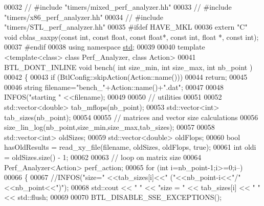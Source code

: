 \begin{DoxyCode}
00032 \textcolor{comment}{// #include "timers/mixed\_perf\_analyzer.hh"}
00033 \textcolor{comment}{// #include "timers/x86\_perf\_analyzer.hh"}
00034 \textcolor{comment}{// #include "timers/STL\_perf\_analyzer.hh"}
00035 \textcolor{preprocessor}{#ifdef HAVE\_MKL}
00036 \textcolor{keyword}{extern} \textcolor{stringliteral}{"C"} \textcolor{keywordtype}{void} cblas\_saxpy(\textcolor{keyword}{const} \textcolor{keywordtype}{int}, \textcolor{keyword}{const} \textcolor{keywordtype}{float}, \textcolor{keyword}{const} \textcolor{keywordtype}{float}*, \textcolor{keyword}{const} \textcolor{keywordtype}{int}, \textcolor{keywordtype}{float} *, \textcolor{keyword}{const} \textcolor{keywordtype}{int});
00037 \textcolor{preprocessor}{#endif}
00038 \textcolor{keyword}{using namespace }\hyperlink{namespacestd}{std};
00039 
00040 \textcolor{keyword}{template} <\textcolor{keyword}{template}<\textcolor{keyword}{class}> \textcolor{keyword}{class }Perf\_Analyzer, \textcolor{keyword}{class }Action>
00041 BTL\_DONT\_INLINE \textcolor{keywordtype}{void} bench( \textcolor{keywordtype}{int} size\_min, \textcolor{keywordtype}{int} size\_max, \textcolor{keywordtype}{int} nb\_point )
00042 \{
00043   \textcolor{keywordflow}{if} (BtlConfig::skipAction(Action::name()))
00044     \textcolor{keywordflow}{return};
00045 
00046   \textcolor{keywordtype}{string} filename=\textcolor{stringliteral}{"bench\_"}+Action::name()+\textcolor{stringliteral}{".dat"};
00047 
00048   INFOS(\textcolor{stringliteral}{"starting "} <<filename);
00049 
00050   \textcolor{comment}{// utilities}
00051 
00052   std::vector<double> tab\_mflops(nb\_point);
00053   std::vector<int> tab\_sizes(nb\_point);
00054 
00055   \textcolor{comment}{// matrices and vector size calculations}
00056   size\_lin\_log(nb\_point,size\_min,size\_max,tab\_sizes);
00057 
00058   std::vector<int> oldSizes;
00059   std::vector<double> oldFlops;
00060   \textcolor{keywordtype}{bool} hasOldResults = read\_xy\_file(filename, oldSizes, oldFlops, \textcolor{keyword}{true});
00061   \textcolor{keywordtype}{int} oldi = oldSizes.size() - 1;
00062 
00063   \textcolor{comment}{// loop on matrix size}
00064   Perf\_Analyzer<Action> perf\_action;
00065   \textcolor{keywordflow}{for} (\textcolor{keywordtype}{int} i=nb\_point-1;i>=0;i--)
00066   \{
00067     \textcolor{comment}{//INFOS("size=" <<tab\_sizes[i]<<"   ("<<nb\_point-i<<"/"<<nb\_point<<")");}
00068     std::cout << \textcolor{stringliteral}{" "} << \textcolor{stringliteral}{"size = "} << tab\_sizes[i] << \textcolor{stringliteral}{"  "} << std::flush;
00069 
00070     BTL\_DISABLE\_SSE\_EXCEPTIONS();

\end{DoxyCode}
